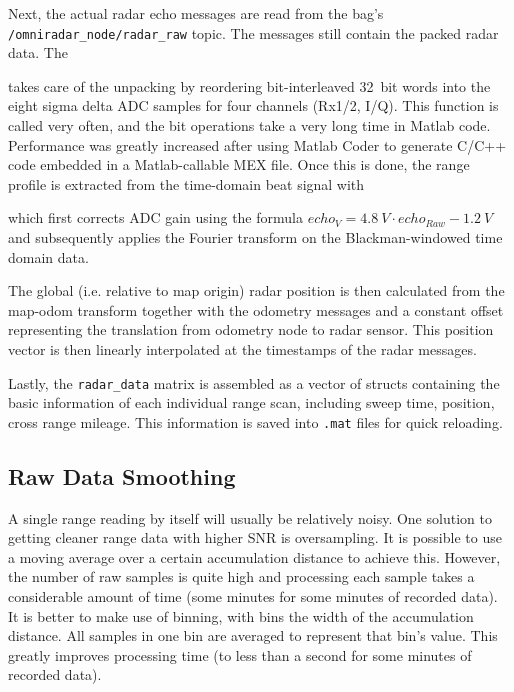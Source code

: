 Next, the actual radar echo messages are read from the bag's \texttt{/omniradar\_node/radar\_raw} topic. The messages still contain the packed radar data. The
\begin{Shaded}
\begin{Highlighting}[]
\end{Highlighting}
\end{Shaded}
takes care of the unpacking by reordering bit-interleaved \SI{32}{bit} words into the eight sigma delta ADC samples for four channels (Rx1/2, I/Q). This function is called very often, and the bit operations take a very long time in Matlab code. Performance was greatly increased after using Matlab Coder to generate C/C++ code embedded in a Matlab-callable MEX file. Once this is done, the range profile is extracted from the time-domain beat signal with
\begin{Shaded}
\begin{Highlighting}[]
\end{Highlighting}
\end{Shaded}
which first corrects ADC gain using the formula $echo_{V} = \SI{4.8}{V} \cdot echo_{Raw} - \SI{1.2}{V}$ and subsequently applies the Fourier transform on the Blackman-windowed time domain data.

The global (i.e. relative to map origin) radar position is then calculated from the map-odom transform together with the odometry messages and a constant offset representing the translation from odometry node to radar sensor. This position vector is then linearly interpolated at the timestamps of the radar messages.

Lastly, the \texttt{radar\_data} matrix is assembled as a vector of structs containing the basic information of each individual range scan, including sweep time, position, cross range mileage. This information is saved into \texttt{.mat} files for quick reloading.

\subsection{Raw Data Smoothing}\label{raw-data-smoothing}

A single range reading by itself will usually be relatively
noisy. One solution to getting cleaner range data with higher SNR is
oversampling. It is possible to use a moving average over a certain
accumulation distance to achieve this. However, the number of raw
samples is quite high and processing each sample takes a considerable
amount of time (some minutes for some minutes of recorded data). It is
better to make use of binning, with bins the width of the accumulation
distance. All samples in one bin are averaged to represent that bin's
value. This greatly improves processing time (to less than a second for
some minutes of recorded data).

